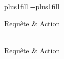 \documentclass[letterpaper,10pt,french]{sphinxmanual}
\begin{document}
\begin{savenotes}
\sphinxatlongtablestart
\sphinxthistablewithglobalstyle
\makeatletter
  \LTleft \@totalleftmargin plus1fill
  \LTright\dimexpr\columnwidth-\@totalleftmargin-\linewidth\relax plus1fill
\makeatother
\begin{longtable}{}
\sphinxtoprule
\sphinxstyletheadfamily 
\sphinxAtStartPar
Requête
&\sphinxstyletheadfamily 
\sphinxAtStartPar
Action
\\
\sphinxmidrule
\endfirsthead

\\
\sphinxtoprule
\sphinxstyletheadfamily 
\sphinxAtStartPar
Requête
&\sphinxstyletheadfamily 
\sphinxAtStartPar
Action
\\
\sphinxmidrule
\endhead

\sphinxbottomrule
{}\\
\endfoot

\endlastfoot
\sphinxtableatstartofbodyhook


\end{longtable}
\end{savenotes}
\end{document}
